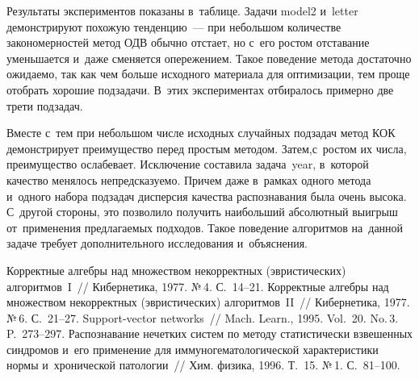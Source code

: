 \begin{multicols}{2}
Результаты экспериментов показаны в~таблице.
Задачи model2 и~letter демонстрируют похожую тенденцию~--- при небольшом 
количестве закономерностей метод ОДВ обычно отстает, но с~его ростом 
отставание уменьшается и~даже сменяется опережением.
Такое поведение метода достаточно ожидаемо, так как 
чем больше исходного материала для оптимизации, тем проще отобрать хорошие подзадачи.
В~этих экспериментах отбиралось примерно две трети подзадач.


Вместе с~тем при небольшом числе исходных случайных подзадач метод КОК 
демонстрирует преимущество перед простым методом.
Затем,\linebreak с~рос\-том их числа, преимущество ослабевает.
Исключение составила задача~{year}, в~которой качество 
менялось непредсказуемо.
Причем даже в~рамках одного метода и~одного набора подзадач 
дисперсия качества распознавания была очень высока.
С~другой стороны, это позволило получить наибольший абсолютный 
выигрыш от~применения пред\-ла\-га\-емых подходов.
Такое поведение алгоритмов на~данной задаче требует дополнительного 
исследования и~объяснения.

{\small\frenchspacing
 {%
 \begin{thebibliography}{99}
{Корректные алгебры над множеством некорректных (эвристических) алгоритмов~I}~//
    Кибернетика,  1977. №\,4. С.~14--21.
{Корректные алгебры над множеством некорректных (эвристических) алгоритмов~II}~//
    Кибернетика,  1977. №\,6. С.~21--27.
{Support-vector networks}~//
    Mach. Learn.,  1995. Vol.~20. No.\,3. P.~273--297.
    Распознавание нечетких сис\-тем по методу статистически взвешенных синдромов 
    и~его применение для иммуногематологической характеристики нормы 
    и~хронической патологии~// Хим. физика, 1996.  Т.~15. №\,1.  С.~81--100.



\end{thebibliography}}}
\end{multicols}
